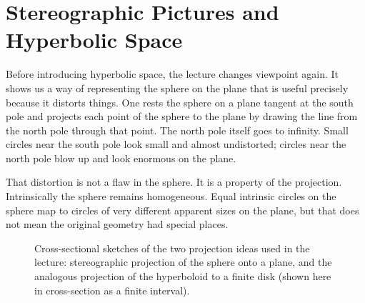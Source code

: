 \section{Stereographic Pictures and Hyperbolic Space}

Before introducing hyperbolic space, the lecture changes viewpoint again. It shows us a way of representing the sphere on the plane that is useful precisely because it distorts things. One rests the sphere on a plane tangent at the south pole and projects each point of the sphere to the plane by drawing the line from the north pole through that point. The north pole itself goes to infinity. Small circles near the south pole look small and almost undistorted; circles near the north pole blow up and look enormous on the plane.

That distortion is not a flaw in the sphere. It is a property of the projection. Intrinsically the sphere remains homogeneous. Equal intrinsic circles on the sphere map to circles of very different apparent sizes on the plane, but that does not mean the original geometry had special places.

\begin{figure}[htbp]
\centering
{}
\caption{Cross-sectional sketches of the two projection ideas used in the lecture: stereographic projection of the sphere onto a plane, and the analogous projection of the hyperboloid to a finite disk (shown here in cross-section as a finite interval).}
\end{figure}

